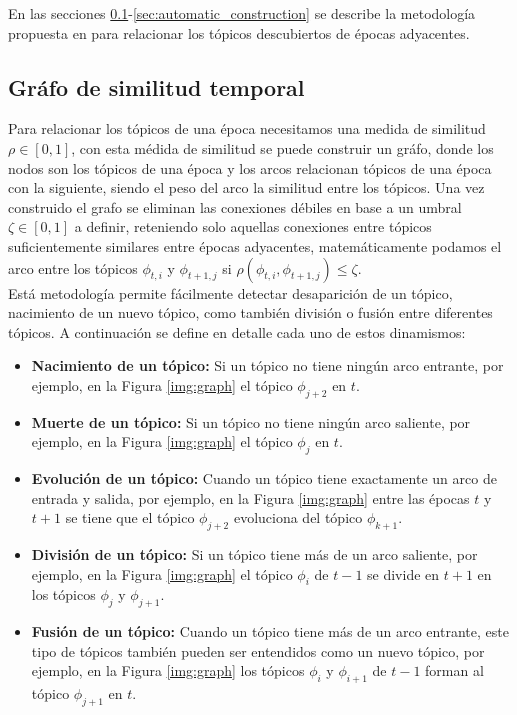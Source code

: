 En las secciones \ref{sec:similarity_graph}-\ref{sec:automatic_construction} se describe la metodología propuesta en \citep{beykikhoshk2018discovering} para relacionar los tópicos descubiertos de épocas adyacentes.

\subsection{Gráfo de similitud temporal}
\label{sec:similarity_graph}
Para relacionar los tópicos de una época necesitamos una medida de similitud $\rho \in [0,1]$, con esta médida de similitud se puede construir un gráfo, donde los nodos son los tópicos de una época y los arcos relacionan tópicos de una época con la siguiente, siendo el peso del arco la similitud entre los tópicos. Una vez construido el grafo se eliminan las conexiones débiles en base a un umbral $\zeta \in [0,1]$ a definir, reteniendo solo aquellas conexiones entre tópicos suficientemente similares entre épocas adyacentes, matemáticamente podamos el arco entre los tópicos $\phi_{t,i}$ y $\phi_{t+1,j}$ si $\rho(\phi_{t,i}, \phi_{t+1,j})\leq \zeta$.\\

Está metodología permite fácilmente detectar desaparición de un tópico, nacimiento de un nuevo tópico, como también división o fusión entre diferentes tópicos. A continuación se define en detalle cada uno de estos dinamismos:

\begin{itemize}
    \item \textbf{Nacimiento de un tópico:} Si un tópico no tiene ningún arco entrante, por ejemplo, en la Figura \ref{img:graph} el tópico $\phi_{j+2}$ en $t$.
    \item \textbf{Muerte de un tópico:} Si un tópico no tiene ningún arco saliente, por ejemplo, en la Figura \ref{img:graph} el tópico $\phi_{j}$ en $t$.
    \item \textbf{Evolución de un tópico:} Cuando un tópico tiene exactamente un arco de entrada y salida, por ejemplo, en la Figura \ref{img:graph} entre las épocas $t$ y $t+1$ se tiene que el tópico $\phi_{j+2}$ evoluciona del tópico $\phi_{k+1}$.
    \item \textbf{División de un tópico:} Si un tópico tiene más de un arco saliente, por ejemplo, en la Figura \ref{img:graph} el tópico $\phi_{i}$ de $t-1$ se divide en $t+1$ en los tópicos $\phi_{j}$ y $\phi_{j+1}$.
    \item \textbf{Fusión de un tópico:} Cuando un tópico tiene más de un arco entrante, este tipo de tópicos también pueden ser entendidos como un nuevo tópico, por ejemplo, en la Figura \ref{img:graph} los tópicos $\phi_{i}$ y $\phi_{i+1}$ de $t-1$ forman al tópico $\phi_{j+1}$ en $t$.
\end{itemize}

